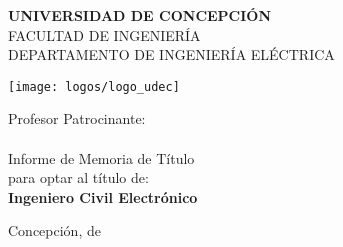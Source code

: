 \begin{titlepage}
\begingroup

\linespread{1}\selectfont
\setlength{\parskip}{0pt}
	
{ \vspace*{2 pc} }

\begin{center}
	\textbf{\LARGE UNIVERSIDAD DE CONCEPCIÓN} \\[0.4 pc]
	{\large FACULTAD DE INGENIERÍA} \\[0.4 pc]
	{ DEPARTAMENTO DE INGENIERÍA ELÉCTRICA} \\[0.4 pc]
\end{center}

\vspace{6 pc}

\noindent\begin{minipage}{0.35\textwidth}\hfill\end{minipage}
%
\begin{minipage}[t]{0.25\textwidth}
	\centering
	\texttt{[image: logos/logo\_udec]}
\end{minipage}
%
\hspace*{0.5cm}
%
\begin{minipage}{0.35\textwidth}
	Profesor Patrocinante: \\[0.4 pc] \textbf{\AdvisorNameA} \\
	\vskip 4.3cm
	Informe de Memoria de Título \\
	para optar al título de: \\[0.4 pc]
	\textbf{Ingeniero Civil Electrónico}
\end{minipage}

\vspace{9 pc}

\begin{center}
	\textbf{\LARGE \MainTitle}
\end{center}
%
%
\vfill
Concepción,
\ifdefined\MyCustomDate
	\MyCustomDate
\else
	{\monthname} de \the\year
\fi
\hfill \AuthorName
%
%
\endgroup
\end{titlepage}
